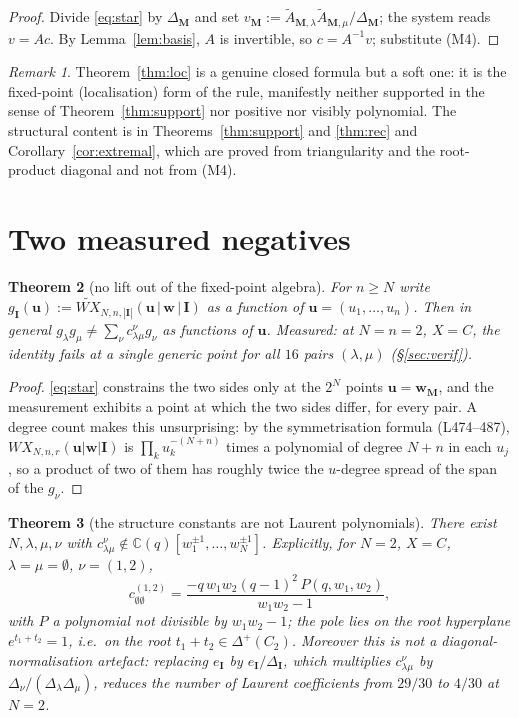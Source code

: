 \documentclass[11pt]{article}
\theoremstyle{plain}
\newtheorem{thm}{Theorem}
\theoremstyle{definition}
\theoremstyle{remark}
\newtheorem{rem}[thm]{Remark}
\newcommand{\bI}{\mathbf{I}}
\newcommand{\bM}{\mathbf{M}}
\newcommand{\bu}{\mathbf{u}}
\newcommand{\bw}{\mathbf{w}}
\newcommand{\WXt}{\widetilde{W\!X}}
\begin{document}
\begin{proof}
Divide \eqref{eq:star} by $\Delta_{\bM}$ and set
$v_{\bM}:=\widetilde A_{\bM,\lambda}\widetilde A_{\bM,\mu}/\Delta_{\bM}$; the
system reads $v=Ac$.  By Lemma~\ref{lem:basis}, $A$ is invertible, so
$c=A^{-1}v$; substitute (M4).
\end{proof}

\begin{rem}
Theorem~\ref{thm:loc} is a genuine closed formula but a soft one: it is the
fixed-point (localisation) form of the rule, manifestly neither supported in the
sense of Theorem~\ref{thm:support} nor positive nor visibly polynomial.  The
structural content is in Theorems~\ref{thm:support} and \ref{thm:rec} and
Corollary~\ref{cor:extremal}, which are proved from triangularity and the
root-product diagonal and not from (M4).
\end{rem}

\section{Two measured negatives}

\begin{thm}[no lift out of the fixed-point algebra]\label{thm:nolift}
For $n\ge N$ write $g_{\bI}(\bu):=\WXt_{N,n,|\bI|}(\bu\,|\,\bw\,|\,\bI)$ as a
function of $\bu=(u_1,\dots,u_n)$.  Then in general
$g_{\lambda}g_{\mu}\ne\sum_{\nu}c^{\nu}_{\lambda\mu}g_{\nu}$ as functions of
$\bu$.  Measured: at $N=n=2$, $X=C$, the identity fails at a single generic
point for \emph{all $16$} pairs $(\lambda,\mu)$ (\S\ref{sec:verif}).
\end{thm}

\begin{proof}
\eqref{eq:star} constrains the two sides only at the $2^N$ points
$\bu=\bw_{\bM}$, and the measurement exhibits a point at which the two sides
differ, for every pair.  A degree count makes this unsurprising: by the
symmetrisation formula (L474--487), $WX_{N,n,r}(\bu|\bw|\bI)$ is
$\prod_ku_k^{-(N+n)}$ times a polynomial of degree $N+n$ in each $u_j$, so a
product of two of them has roughly twice the $u$-degree spread of the span of
the $g_{\nu}$.
\end{proof}

\begin{thm}[the structure constants are not Laurent polynomials]\label{thm:nonpoly}
There exist $N,\lambda,\mu,\nu$ with
$c^{\nu}_{\lambda\mu}\notin\mathbb C(q)[w_1^{\pm1},\dots,w_N^{\pm1}]$.
Explicitly, for $N=2$, $X=C$, $\lambda=\mu=\emptyset$, $\nu=(1,2)$,
\[
c^{(1,2)}_{\emptyset\emptyset}
=\frac{-q\,w_1w_2(q-1)^2\,P(q,w_1,w_2)}{w_1w_2-1},
\]
with $P$ a polynomial not divisible by $w_1w_2-1$; the pole lies on the root
hyperplane $e^{t_1+t_2}=1$, i.e.\ on the root $t_1+t_2\in\Delta^+(C_2)$.
Moreover this is \emph{not} a diagonal-normalisation artefact: replacing
$e_{\bI}$ by $e_{\bI}/\Delta_{\bI}$, which multiplies $c^{\nu}_{\lambda\mu}$ by
$\Delta_{\nu}/(\Delta_{\lambda}\Delta_{\mu})$, reduces the number of Laurent
coefficients from $29/30$ to $4/30$ at $N=2$.
\end{thm}
\end{document}
